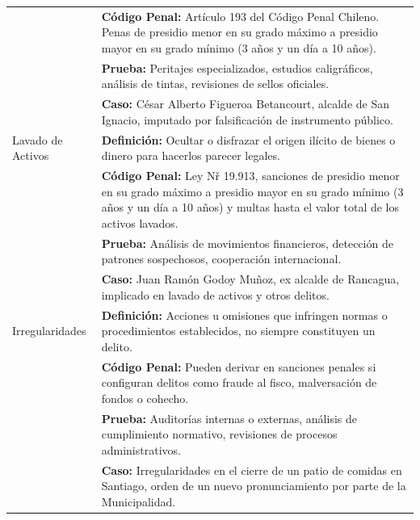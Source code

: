 \documentclass[letter,12pt]{article}
\begin{document}
\begin{longtable}{|p{3cm}|p{12cm}|}
		\cline{2-2}
		& \textbf{Código Penal:} Artículo 193 del Código Penal Chileno. Penas de presidio menor en su grado máximo a presidio mayor en su grado mínimo (3 años y un día a 10 años). \\
		\cline{2-2}
		& \textbf{Prueba:} Peritajes especializados, estudios caligráficos, análisis de tintas, revisiones de sellos oficiales. \\
		\cline{2-2}
		& \textbf{Caso:} César Alberto Figueroa Betancourt, alcalde de San Ignacio, imputado por falsificación de instrumento público. \\
		\hline
		Lavado de Activos &
		\textbf{Definición:} Ocultar o disfrazar el origen ilícito de bienes o dinero para hacerlos parecer legales. \\
		\cline{2-2}
		& \textbf{Código Penal:} Ley Nř 19.913, sanciones de presidio menor en su grado máximo a presidio mayor en su grado mínimo (3 años y un día a 10 años) y multas hasta el valor total de los activos lavados. \\
		\cline{2-2}
		& \textbf{Prueba:} Análisis de movimientos financieros, detección de patrones sospechosos, cooperación internacional. \\
		\cline{2-2}
		& \textbf{Caso:} Juan Ramón Godoy Muñoz, ex alcalde de Rancagua, implicado en lavado de activos y otros delitos. \\
		\hline
		Irregularidades &
		\textbf{Definición:} Acciones u omisiones que infringen normas o procedimientos establecidos, no siempre constituyen un delito. \\
		\cline{2-2}
		& \textbf{Código Penal:} Pueden derivar en sanciones penales si configuran delitos como fraude al fisco, malversación de fondos o cohecho. \\
		\cline{2-2}
		& \textbf{Prueba:} Auditorías internas o externas, análisis de cumplimiento normativo, revisiones de procesos administrativos. \\
		\cline{2-2}
		& \textbf{Caso:} Irregularidades en el cierre de un patio de comidas en Santiago, orden de un nuevo pronunciamiento por parte de la Municipalidad. \\
		\hline
	\end{longtable}
\end{document}
